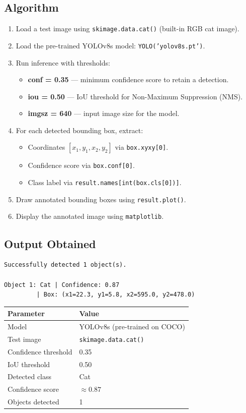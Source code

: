 \documentclass[12pt,a4paper]{article}
\begin{document}
\subsection*{Algorithm}
\begin{enumerate}[leftmargin=*, label=\arabic*.]
  \item Load a test image using \texttt{skimage.data.cat()} (built-in RGB cat image).
  \item Load the pre-trained YOLOv8s model: \texttt{YOLO('yolov8s.pt')}.
  \item Run inference with thresholds:
    \begin{itemize}
      \item \textbf{conf = 0.35} --- minimum confidence score to retain a detection.
      \item \textbf{iou = 0.50} --- IoU threshold for Non-Maximum Suppression (NMS).
      \item \textbf{imgsz = 640} --- input image size for the model.
    \end{itemize}
  \item For each detected bounding box, extract:
    \begin{itemize}
      \item Coordinates $[x_1, y_1, x_2, y_2]$ via \texttt{box.xyxy[0]}.
      \item Confidence score via \texttt{box.conf[0]}.
      \item Class label via \texttt{result.names[int(box.cls[0])]}.
    \end{itemize}
  \item Draw annotated bounding boxes using \texttt{result.plot()}.
  \item Display the annotated image using \texttt{matplotlib}.
\end{enumerate}

\subsection*{Output Obtained}

\begin{verbatim}
Successfully detected 1 object(s).

Object 1: Cat | Confidence: 0.87
         | Box: (x1=22.3, y1=5.8, x2=595.0, y2=478.0)
\end{verbatim}

\begin{center}
\begin{tabular}{ll}
\toprule
\textbf{Parameter} & \textbf{Value} \\
\midrule
Model              & YOLOv8s (pre-trained on COCO) \\
Test image         & \texttt{skimage.data.cat()} \\
Confidence threshold & 0.35 \\
IoU threshold      & 0.50 \\
Detected class     & Cat \\
Confidence score   & $\approx 0.87$ \\
Objects detected   & 1 \\
\bottomrule
\end{tabular}
\end{center}
\end{document}

